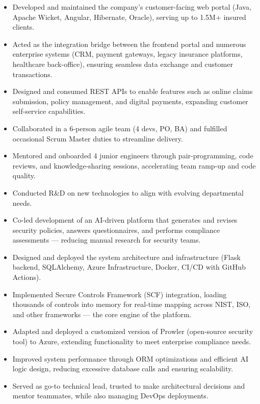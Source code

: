 \documentclass[10pt,a4paper,ragged2e,withhyper]{altacv}
\begin{document}
\begin{paracol}{2}
            \begin{itemize}
                \item Developed and maintained the company’s customer-facing web portal (Java, Apache Wicket, Angular, Hibernate, Oracle), serving up to 1.5M+ insured clients.
                \item Acted as the integration bridge between the frontend portal and numerous enterprise systems (CRM, payment gateways, legacy insurance platforms, healthcare back-office), ensuring seamless data exchange and customer transactions.
                \item Designed and consumed REST APIs to enable features such as online claims submission, policy management, and digital payments, expanding customer self-service capabilities.
                \item Collaborated in a 6-person agile team (4 devs, PO, BA) and fulfilled occasional Scrum Master duties to streamline delivery.
                \item Mentored and onboarded 4 junior engineers through pair-programming, code reviews, and knowledge-sharing sessions, accelerating team ramp-up and code quality.
                \item Conducted R\&D on new technologies to align with evolving departmental needs.
            \end{itemize}

            \divider

            \begin{itemize}
                \item Co-led development of an AI-driven platform that generates and revises security policies, answers questionnaires, and performs compliance assessments — reducing manual research for security teams.
                \item Designed and deployed the system architecture and infrastructure (Flask backend, SQLAlchemy, Azure Infrastructure, Docker, CI/CD with GitHub Actions).
                \item Implemented Secure Controls Framework (SCF) integration, loading thousands of controls into memory for real-time mapping across NIST, ISO, and other frameworks — the core engine of the platform.
                \item Adapted and deployed a customized version of Prowler (open-source security tool) to Azure, extending functionality to meet enterprise compliance needs.
                \item Improved system performance through ORM optimizations and efficient AI logic design, reducing excessive database calls and ensuring scalability.
                \item Served as go-to technical lead, trusted to make architectural decisions and mentor teammates, while also managing DevOps deployments.
            \end{itemize}
            

\end{paracol}
\end{document}
